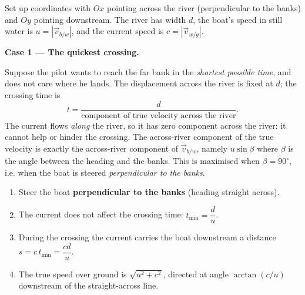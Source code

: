 \documentclass[11pt]{article}
\begin{document}
Set up coordinates with $Ox$ pointing across the river (perpendicular to the banks) and $Oy$ pointing downstream. The river has width $d$, the boat's speed in still water is $u = |\vec{v}_{b/w}|$, and the current speed is $c = |\vec{v}_{w/g}|$.

\textbf{Case 1 — The quickest crossing.}

Suppose the pilot wants to reach the far bank in the \emph{shortest possible time}, and does not care where he lands. The displacement across the river is fixed at $d$; the crossing time is
\[
t = \frac{d}{\text{component of true velocity across the river}}.
\]
The current flows \emph{along} the river, so it has zero component across the river: it cannot help or hinder the crossing. The across-river component of the true velocity is exactly the across-river component of $\vec{v}_{b/w}$, namely $u\sin\beta$ where $\beta$ is the angle between the heading and the banks. This is maximised when $\beta = 90^\circ$, i.e. when the boat is steered \emph{perpendicular to the banks}.

\begin{methode}
\begin{enumerate}
\item Steer the boat \textbf{perpendicular to the banks} (heading straight across).
\item The current does not affect the crossing time: $t_{\min} = \dfrac{d}{u}$.
\item During the crossing the current carries the boat downstream a distance $s = c\,t_{\min} = \dfrac{cd}{u}$.
\item The true speed over ground is $\sqrt{u^2 + c^2}$, directed at angle $\arctan(c/u)$ downstream of the straight-across line.
\end{enumerate}
\end{methode}
\end{document}
